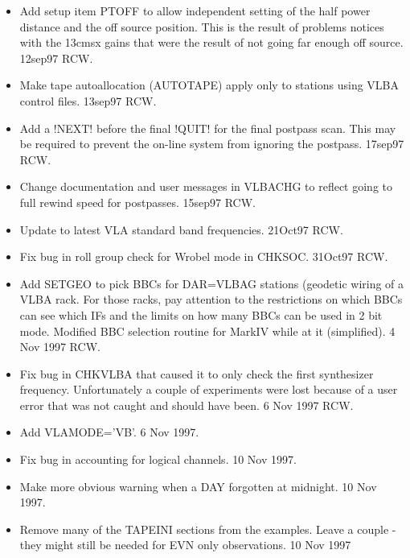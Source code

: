 \documentclass{report}
\begin{document}
\begin{itemize}
\item Add setup item PTOFF to allow independent setting of the
      half power distance and the off source position.  This
      is the result of problems notices with the 13cmsx gains that
      were the result of not going far enough off source.
      12sep97  RCW.

\item Make tape autoallocation (AUTOTAPE) apply only to stations
      using VLBA control files.  13sep97 RCW.

\item Add a !NEXT! before the final !QUIT! for the final postpass
      scan.  This may be required to prevent the on-line system
      from ignoring the postpass.  17sep97  RCW.

\item Change documentation and user messages in VLBACHG to reflect
      going to full rewind speed for postpasses. 15sep97 RCW.

\item Update to latest VLA standard band frequencies.  21Oct97 RCW.

\item Fix bug in roll group check for Wrobel mode in CHKSOC.  31Oct97 RCW.

\item Add SETGEO to pick BBCs for DAR=VLBAG stations (geodetic wiring
      of a VLBA rack.  For those racks, pay attention to the
      restrictions on which BBCs can see which IFs and the limits
      on how many BBCs can be used in 2 bit mode.  Modified BBC
      selection routine for MarkIV while at it (simplified).
      4 Nov 1997  RCW.

\item Fix bug in CHKVLBA that caused it to only check the first
      synthesizer frequency.  Unfortunately a couple of experiments
      were lost because of a user error that was not caught and should
      have been.  6 Nov 1997  RCW.

\item Add VLAMODE='VB'.  6 Nov 1997.

\item Fix bug in accounting for logical channels.  10 Nov 1997.

\item Make more obvious warning when a DAY forgotten at midnight.
      10 Nov 1997.

\item Remove many of the TAPEINI sections from the examples.  Leave
      a couple - they might still be needed for EVN only observations.
      10 Nov 1997


\end{itemize}
\end{document}
